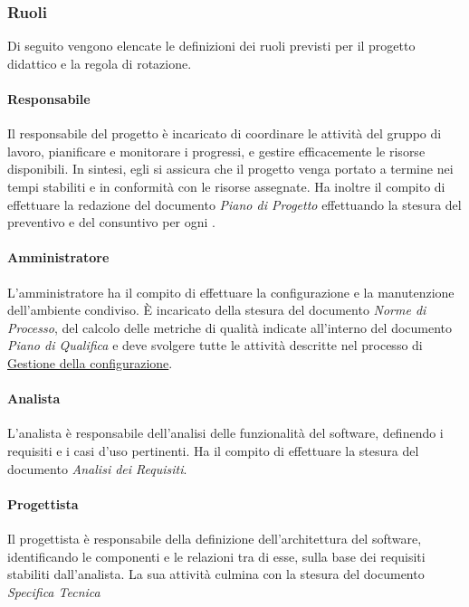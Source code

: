 \subsubsection{Ruoli}
\label{subsubsec:ruoli}
Di seguito vengono elencate le definizioni dei ruoli previsti per il progetto didattico e la regola di rotazione.

\paragraph{Responsabile}
Il responsabile del progetto è incaricato di coordinare le attività del gruppo di lavoro, pianificare e monitorare i progressi, e gestire efficacemente le risorse disponibili. 
In sintesi, egli si assicura che il progetto venga portato a termine nei tempi stabiliti e in conformità con le risorse assegnate.
Ha inoltre il compito di effettuare la redazione del documento \textit{Piano di Progetto} effettuando la stesura del preventivo e del consuntivo per ogni .

\paragraph{Amministratore}
L'amministratore ha il compito di effettuare la configurazione e la manutenzione dell'ambiente condiviso.
È incaricato della stesura del documento \textit{Norme di Processo}, del calcolo delle metriche di qualità indicate all'interno del documento \textit{Piano di Qualifica} e deve svolgere tutte le attività
descritte nel processo di \hyperref[subsec:gestione_della_configurazione]{Gestione della configurazione}.

\paragraph{Analista}
L'analista è responsabile dell'analisi delle funzionalità del software, definendo i requisiti e i casi d'uso pertinenti.
Ha il compito di effettuare la stesura del documento \textit{Analisi dei Requisiti}.

\paragraph{Progettista}
Il progettista è responsabile della definizione dell'architettura del software, identificando le componenti e le relazioni tra di esse, sulla base dei requisiti stabiliti dall'analista. 
La sua attività culmina con la stesura del documento \textit{Specifica Tecnica}

